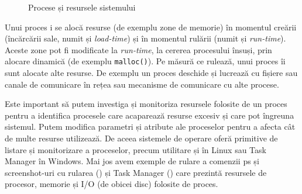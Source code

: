 \begin{figure}[!htbp]
	\centering
	\def\svgwidth{0.8\textwidth}
	
	\caption{Procese și resursele sistemului}
	\label{fig:process-resources}
\end{figure}

Unui proces i se alocă resurse (de exemplu zone de memorie) în momentul creării
(încărcării sale, numit și \textit{load-time}) și în momentul rulării (numit și
\textit{run-time}). Aceste zone pot fi modificate la \textit{run-time}, la cererea procesului
însuși, prin alocare dinamică (de exemplu \texttt{malloc()}). Pe măsură ce rulează, unui
proces îi sunt alocate alte resurse. De exemplu un proces deschide și lucrează
cu fișiere sau canale de comunicare în rețea sau mecanisme de comunicare cu alte
procese.

Este important să putem investiga și monitoriza resursele folosite de un proces
pentru a identifica procesele care acaparează resurse excesiv și care pot
îngreuna sistemul. Putem modifica parametri și atribute ale proceselor pentru a
afecta cât de multe resurse utilizează. De aceea sistemele de operare oferă
primitive de listare și monitorizare a proceselor, precum utilitare  și  în
Linux sau Task Manager în Windows. Mai jos avem exemple de rulare a comenzii ps
și screenshot-uri cu rularea  () și Task Manager
() care prezintă resursele de procesor, memorie și
I/O (de obicei disc) folosite de proces.


